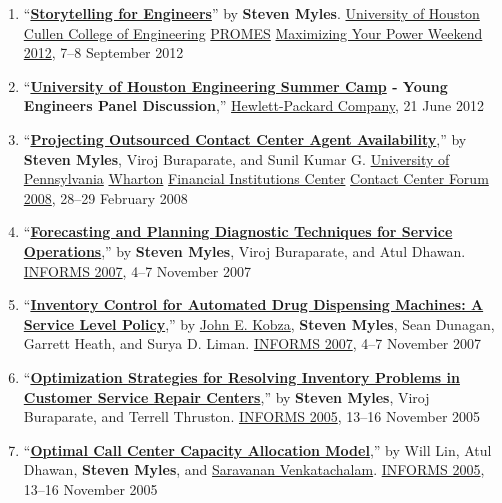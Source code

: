 \documentclass[
]{article}
\providecommand{\tightlist}{%
  \setlength{\itemsep}{0pt}\setlength{\parskip}{0pt}}
\begin{document}
\begin{enumerate}
\def\labelenumi{\arabic{enumi}.}
\tightlist
\item
  ``\href{https://stevemyles.site/blog/2012/09/09/storytelling-for-engineers/}{\textbf{Storytelling
  for Engineers}}'' by \textbf{Steven Myles}.
  \href{https://www.uh.edu/}{University of Houston}
  \href{https://www.egr.uh.edu/}{Cullen College of Engineering}
  \href{http://promes.egr.uh.edu/}{PROMES}
  \href{https://stevemyles.site/blog/2012/09/09/uh-maximizing-your-power-weekend/}{Maximizing
  Your Power Weekend 2012}, 7--8 September 2012
\item
  ``\textbf{\href{https://www.egr.uh.edu/camps}{University of Houston
  Engineering Summer Camp} - Young Engineers Panel Discussion},''
  \href{https://www.hp.com/}{Hewlett-Packard Company}, 21 June 2012
\item
  ``\href{https://stevemyles.site/blog/2008/02/29/projecting-outsourced-contact-center-agent-availability/}{\textbf{Projecting
  Outsourced Contact Center Agent Availability}},'' by \textbf{Steven
  Myles}, Viroj Buraparate, and Sunil Kumar G.
  \href{https://www.upenn.edu/}{University of Pennsylvania}
  \href{https://www.wharton.upenn.edu/}{Wharton}
  \href{https://fic.wharton.upenn.edu/fic/}{Financial Institutions
  Center}
  \href{https://web.archive.org/web/20100623190502/http://fic.wharton.upenn.edu/fic/call\%20center\%2008/agenda.htm}{Contact
  Center Forum 2008}, 28--29 February 2008
\item
  ``\href{https://stevemyles.site/blog/2007/10/30/informs-2007-presentations/}{\textbf{Forecasting
  and Planning Diagnostic Techniques for Service Operations}},'' by
  \textbf{Steven Myles}, Viroj Buraparate, and Atul Dhawan.
  \href{https://web.archive.org/web/20140731003202/http://meetings2.informs.org/Seattle07/}{INFORMS
  2007}, 4--7 November 2007
\item
  ``\href{https://stevemyles.site/blog/2007/10/30/informs-2007-presentations/}{\textbf{Inventory
  Control for Automated Drug Dispensing Machines: A Service Level
  Policy}},'' by \href{https://ise.utk.edu/people/john-e-kobza/}{John E.
  Kobza}, \textbf{Steven Myles}, Sean Dunagan, Garrett Heath, and Surya
  D. Liman.
  \href{https://web.archive.org/web/20140731003202/http://meetings2.informs.org/Seattle07/}{INFORMS
  2007}, 4--7 November 2007
\item
  ``\href{https://stevemyles.site/blog/2005/11/11/informs-2005-presentations/}{\textbf{Optimization
  Strategies for Resolving Inventory Problems in Customer Service Repair
  Centers}},'' by \textbf{Steven Myles}, Viroj Buraparate, and Terrell
  Thruston.
  \href{https://web.archive.org/web/20170524053146/http://meetings2.informs.org/NO2005/}{INFORMS
  2005}, 13--16 November 2005
\item
  ``\href{https://stevemyles.site/blog/2005/11/11/informs-2005-presentations/}{\textbf{Optimal
  Call Center Capacity Allocation Model}},'' by Will Lin, Atul Dhawan,
  \textbf{Steven Myles}, and
  \href{https://engineering.wayne.edu/profile/saravanan.venkatachalam/}{Saravanan
  Venkatachalam}.
  \href{https://web.archive.org/web/20170524053146/http://meetings2.informs.org/NO2005/}{INFORMS
  2005}, 13--16 November 2005
\end{enumerate}
\end{document}
